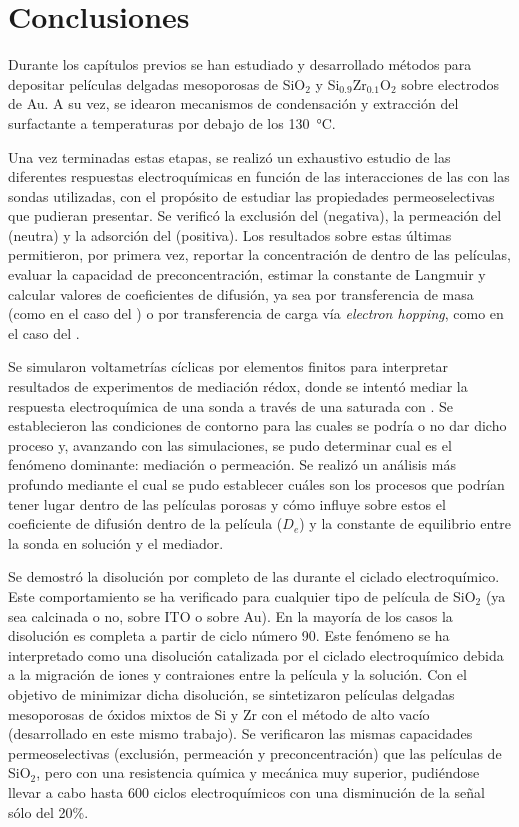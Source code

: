 \section{Conclusiones}
	
	Durante los capítulos previos se han estudiado y desarrollado métodos para depositar películas delgadas mesoporosas de SiO$_2$ y Si$_{0.9}$Zr$_{0.1}$O$_2$  sobre electrodos de Au. A su vez, se idearon mecanismos de condensación y extracción del surfactante a temperaturas por debajo de los \SI{130}{\celsius}. 

	Una vez terminadas estas etapas, se realizó un exhaustivo estudio de las diferentes respuestas electroquímicas en función de las interacciones de las \pdm\space con las sondas utilizadas, con el propósito de estudiar las propiedades permeoselectivas que pudieran presentar. Se verificó la exclusión del \ferroferri\space (negativa), la permeación del \fc\space (neutra) y la adsorción del \aminorutenio\space (positiva). Los resultados sobre estas últimas permitieron, por primera vez, reportar la concentración de \ru\space dentro de las películas, evaluar la capacidad de preconcentración, estimar la constante de Langmuir y calcular valores de coeficientes de difusión, ya sea por transferencia de masa (como en el caso del \fc) o por transferencia de carga vía \textit{electron hopping}, como en el caso del \ru.

	Se simularon voltametrías cíclicas por elementos finitos para interpretar resultados de experimentos de mediación rédox, donde se intentó mediar la respuesta electroquímica de una sonda a través de una \pdm\space saturada con \ru. Se establecieron las condiciones de contorno para las cuales se podría o no dar dicho proceso y, avanzando con las simulaciones, se pudo determinar cual es el fenómeno dominante: mediación o permeación. Se realizó un análisis más profundo mediante el cual se pudo establecer cuáles son los procesos que podrían tener lugar dentro de las películas porosas y cómo influye sobre estos el coeficiente de difusión dentro de la película ($D_e$) y la constante de equilibrio entre la sonda en solución y el mediador.

	Se demostró la disolución por completo de las \pdmF\space durante el ciclado electroquímico. Este comportamiento se ha verificado para cualquier tipo de película de SiO$_2$ (ya sea calcinada o no, sobre ITO o sobre Au). En la mayoría de los casos la disolución es completa a partir de ciclo número 90. Este fenómeno se ha interpretado como una disolución catalizada por el ciclado electroquímico debida a la migración de iones y contraiones entre la película y la solución. Con el objetivo de minimizar dicha disolución, se sintetizaron películas delgadas mesoporosas de óxidos mixtos de Si y Zr con el método de alto vacío (desarrollado en este mismo trabajo). Se verificaron las mismas capacidades permeoselectivas (exclusión, permeación y preconcentración) que las películas de SiO$_2$, pero con una resistencia química y mecánica muy superior, pudiéndose llevar a cabo hasta 600 ciclos electroquímicos con una disminución de la señal sólo del 20\%.

